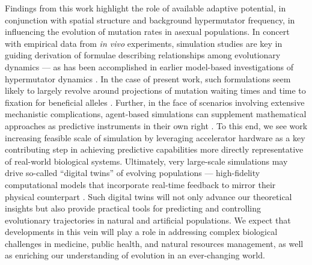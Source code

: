 Findings from this work highlight the role of available adaptive potential, in conjunction with spatial structure and background hypermutator frequency, in influencing the evolution of mutation rates in asexual populations.
In concert with empirical data from \textit{in vivo} experiments, simulation studies are key in guiding derivation of formulae describing relationships among evolutionary dynamics — as has been accomplished in earlier model-based investigations of hypermutator dynamics \citep{wylie2009fixation,raynes2018sign}.
In the case of present work, such formulations seem likely to largely revolve around projections of mutation waiting times and time to fixation for beneficial alleles \citep{ribeck2016competition}.
Further, in the face of scenarios involving extensive mechanistic complications, agent-based simulations can supplement mathematical approaches as predictive instruments in their own right \citep{an2009agent}.
To this end, we see work increasing feasible scale of simulation by leveraging accelerator hardware as a key contributing step in achieving predictive capabilities more directly representative of real-world biological systems.
Ultimately, very large-scale simulations may drive so-called ``digital twins'' of evolving populations --- high-fidelity computational models that incorporate real-time feedback to mirror their physical counterpart \citep{dekoning2023digital}.
Such digital twins will not only advance our theoretical insights but also provide practical tools for predicting and controlling evolutionary trajectories in natural and artificial populations.
We expect that developments in this vein will play a role in addressing complex biological challenges in medicine, public health, and natural resources management, as well as enriching our understanding of evolution in an ever-changing world.
